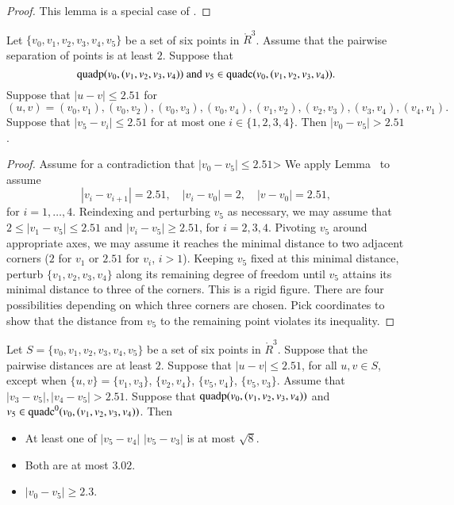 \begin{proof} This  lemma is a special case of
\cite[Lemma~4.3]{part1}.
\end{proof}

\newpage

\begin{lemma}
Let $\{v_0,v_1,v_2,v_3,v_4,v_5\}$ be a set of six points in $\ring{R}^3$.
Assume that the pairwise separation of points is at least $2$.
Suppose that 
  $${\operatorname{quadp}}(v_0,(v_1,v_2,v_3,v_4)) \text{ and }
   v_5\in {\operatorname{quadc}}(v_0,(v_1,v_2,v_3,v_4)).$$
Suppose that $|u-v|\le 2.51$ for
  $$(u,v)=(v_0,v_1), (v_0,v_2), (v_0,v_3), (v_0,v_4), 
  (v_1,v_2), (v_2,v_3), (v_3,v_4), (v_4,v_1).$$
Suppose that
$|v_5-v_i|\le 2.51$ for at most one $i\in\{1,2,3,4\}$.  Then
$|v_0-v_5| > 2.51$.
\end{lemma}



\begin{proof} Assume for a contradiction that $|v_0-v_5|\le2.51$>
We apply Lemma~ to assume
    $$|v_i-v_{i+1}|=2.51,\quad |v_i-v_0|=2, \quad |v-v_0|=2.51,$$
for $i=1,\ldots,4$. Reindexing and perturbing $v_5$ as necessary, we
may assume that $2\le |v_1-v_5|\le2.51$ and $|v_i-v_5|\ge2.51$, for
$i=2,3,4$.  Pivoting $v_5$ around appropriate axes, 
we may assume it reaches the minimal
distance to two adjacent corners ($2$ for $v_1$ or $2.51$ for
$v_i$, $i>1$).  Keeping $v_5$ fixed at this minimal distance,
perturb $\{v_1,v_2,v_3,v_4\}$ along its remaining degree of freedom
until $v_5$ attains its minimal distance to three of the corners.
This is a rigid figure.  There are four possibilities depending on
which three corners are chosen. Pick coordinates to show that the
distance from $v_5$ to the remaining point violates its inequality.
\end{proof}

\newpage

\begin{lemma}
Let $S=\{v_0,v_1,v_2,v_3,v_4,v_5\}$ be a set of six points in
$\ring{R}^3$.  Suppose that the pairwise distances are at least
$2$.  Suppose that $|u-v|\le 2.51$, for all $u,v\in S$, 
except
when $\{u,v\}=\{v_1,v_3\}$, $\{v_2,v_4\}$, $\{v_5,v_4\}$,
$\{v_5,v_3\}$.  
Assume that $|v_3-v_5|,|v_4-v_5|>2.51$.
Suppose that ${\operatorname{quadp}}(v_0,(v_1,v_2,v_3,v_4))$
and $v_5\in{\operatorname{quadc}}^0(v_0,(v_1,v_2,v_3,v_4))$.
Then
\begin{itemize}
  \item At least one of $|v_5-v_4|$ $|v_5-v_3|$ is at most $\sqrt8$.
    \item Both are at most $3.02$.
  \item $|v_0-v_5|\ge 2.3$.
\end{itemize}
\end{lemma}

